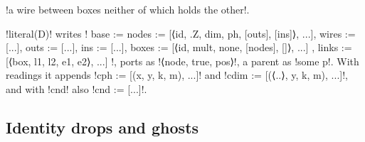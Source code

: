 {{{\begin{algorithm}
\begin{enumerate}
\lexcode!a wire between boxes neither of which holds the other!.
\end{enumerate}
\end{algorithm}
\lexpy!literal(D)! writes \lexlean!{ base := { nodes := [⟨id, .Z, dim, ph, [outs], [ins]⟩, ...], wires := [...], outs := [...], ins := [...], boxes := [⟨id, mult, none, [nodes], []⟩, ...] }, links := [⟨box, l1, l2, e1, e2⟩, ...] }!,
ports as \lexlean!⟨node, true, pos⟩!, a parent as \lexlean!some p!. With readings it appends
\lexlean!cph := [(x, y, k, m), ...]! and \lexlean!cdim := [(⟨..⟩, y, k, m), ...]!, and with
\lexcode!cnd! also \lexlean!cnd := [...]!.

\subsection{Identity drops and ghosts}

}}}

